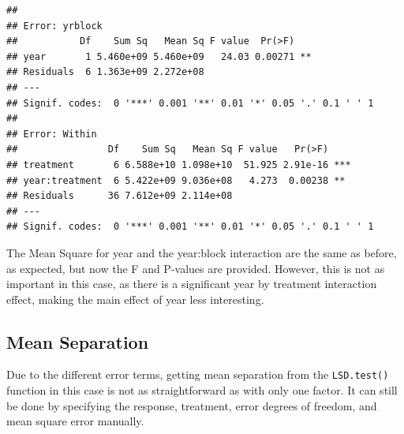\documentclass[letterpaper,]{book}
\newenvironment{Shaded}{\begin{snugshade}}{\end{snugshade}}
\newcommand{\DataTypeTok}[1]{\textcolor[rgb]{0.13,0.29,0.53}{#1}}
\newcommand{\DecValTok}[1]{\textcolor[rgb]{0.00,0.00,0.81}{#1}}
\newcommand{\FloatTok}[1]{\textcolor[rgb]{0.00,0.00,0.81}{#1}}
\newcommand{\KeywordTok}[1]{\textcolor[rgb]{0.13,0.29,0.53}{\textbf{#1}}}
\newcommand{\NormalTok}[1]{#1}
\newcommand{\OperatorTok}[1]{\textcolor[rgb]{0.81,0.36,0.00}{\textbf{#1}}}
\newcommand{\StringTok}[1]{\textcolor[rgb]{0.31,0.60,0.02}{#1}}
\begin{document}
\begin{Shaded}
\end{Shaded}

\begin{verbatim}
## 
## Error: yrblock
##           Df    Sum Sq   Mean Sq F value  Pr(>F)   
## year       1 5.460e+09 5.460e+09   24.03 0.00271 **
## Residuals  6 1.363e+09 2.272e+08                   
## ---
## Signif. codes:  0 '***' 0.001 '**' 0.01 '*' 0.05 '.' 0.1 ' ' 1
## 
## Error: Within
##                Df    Sum Sq   Mean Sq F value   Pr(>F)    
## treatment       6 6.588e+10 1.098e+10  51.925 2.91e-16 ***
## year:treatment  6 5.422e+09 9.036e+08   4.273  0.00238 ** 
## Residuals      36 7.612e+09 2.114e+08                     
## ---
## Signif. codes:  0 '***' 0.001 '**' 0.01 '*' 0.05 '.' 0.1 ' ' 1
\end{verbatim}

The Mean Square for year and the year:block interaction are the same as before, as expected, but now the F and P-values are provided. However, this is not as important in this case, as there is a significant year by treatment interaction effect, making the main effect of year less interesting.

\hypertarget{mean-separation}{%
\subsection{Mean Separation}\label{mean-separation}}

Due to the different error terms, getting mean separation from the \texttt{LSD.test()} function in this case is not as straightforward as with only one factor. It can still be done by specifying the response, treatment, error degrees of freedom, and mean square error manually.

\begin{Shaded}
\end{Shaded}
\end{document}
